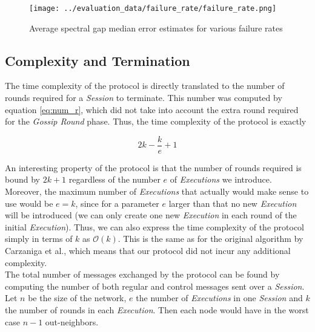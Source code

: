 \documentclass[a4paper,11pt,twoside]{report}
\begin{document}
\begin{figure}
   \centering
    \texttt{[image: ../evaluation\_data/failure\_rate/failure\_rate.png]}
     \caption{Average spectral gap median error estimates for various failure rates}
     \label{fig:failure_rates}
\end{figure}

\subsection{Complexity and Termination}

The time complexity of the protocol is directly translated to the number of rounds required for a \textit{Session} to terminate. This number was computed by equation \ref{eq:num_r}, which did not take into account the extra round required for the \textit{Gossip Round} phase. Thus, the time complexity of the protocol is exactly 

\begin{equation*}
2k - \frac{k}{e} +1
\end{equation*}

An interesting property of the protocol is that the number of rounds required is bound by $2k+1$ regardless of the number $e$ of \textit{Executions} we introduce. Moreover, the maximum number of \textit{Executions} that actually would make sense to use would be $e=k$, since for a parameter $e$ larger than that no new \textit{Execution} will be introduced (we can only create one new \textit{Execution} in each round of the initial \textit{Execution}). Thus, we can also express the time  complexity of the protocol simply in terms of $k$ as $\mathcal{O}(k)$. This is the same as for the original algorithm by Carzaniga et al., which means that our protocol did not incur any additional complexity.\\

The total number of messages exchanged by the protocol can be found by computing the number of both regular and control messages sent over a \textit{Session}. Let $n$ be the size of the network, $e$ the number of \textit{Executions} in one \textit{Session} and $k$ the number of rounds in each \textit{Execution}. Then each node would have in the worst case $n-1$ out-neighbors. \\
\end{document}
